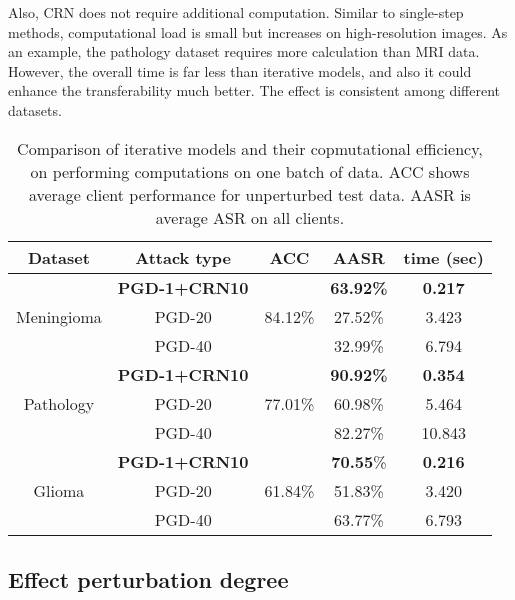 Also, CRN does not require additional computation. Similar to single-step methods, computational load is small but increases on high-resolution images. As an example, the pathology dataset requires more calculation than MRI data. 
However, the overall time is far less than iterative models, and also it could enhance the transferability much better. The effect is consistent among different datasets. 



\begin{table}[h!]
\centering
\setlength{\tabcolsep}{6pt}
\renewcommand\arraystretch{1.22}
\caption{ \small Comparison of iterative models and their copmutational efficiency, on performing computations on one batch of data.  ACC shows average client performance for unperturbed test data. AASR is average ASR on all clients.}
\begin{tabular}{| *{5}{c|} }
\hline
Dataset  & Attack type & ACC & AASR & time (sec)
\\   \hline  
\multirow{3}{5em}{Meningioma}     &\textbf{PGD-1+CRN10}&\multirow{3}{3em}{84.12\%}&\textbf{63.92\%} & \textbf{0.217}  \\
 &PGD-20&&27.52\% & 3.423 \\
&PGD-40&&32.99\% & 6.794  \\ \hline
\multirow{3}{4em}{Pathology}     &\textbf{PGD-1+CRN10}&\multirow{3}{3em}{77.01\%}&\textbf{90.92\%} & \textbf{0.354} \\
&PGD-20&&60.98\% & 5.464\\
&PGD-40&&82.27\% & 10.843 \\ \hline
\multirow{3}{3em}{Glioma}     &\textbf{PGD-1+CRN10}&\multirow{3}{3em}{61.84\%}&\textbf{70.55}\% & \textbf{0.216}  \\
&PGD-20&&51.83\% &3.420  \\
&PGD-40&&63.77\% & 6.793  \\ \hline


\end{tabular}
\label{table_time} 
\end{table}




\subsection{Effect perturbation degree}

